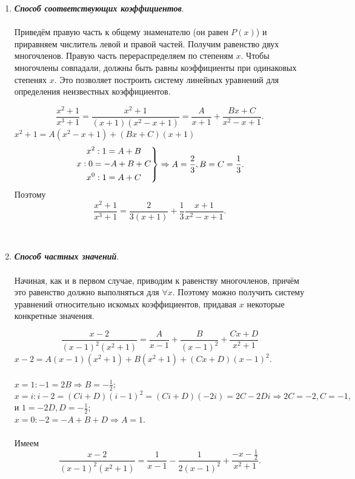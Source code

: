 \begin{enumerate}
	\item \textit{\textbf{Способ соответствующих коэффициентов}}.\\\\
	Приведём правую часть к общему знаменателю (он равен $P(x)$) и приравняем числитель левой и правой частей. Получим равенство двух многочленов. Правую часть перераспределяем по степеням $x$. Чтобы многочлены совпадали, должны быть равны коэффициенты при одинаковых степенях $x$. Это позволяет построить систему линейных уравнений для определения неизвестных коэффициентов.\\
	\begin{example} $$\frac{x^2+1}{x^3+1}=\frac{x^2+1}{(x+1)(x^2-x+1)}=\frac{A}{x+1}+\frac{Bx+C}{x^2-x+1}.$$
		$x^2+1=A(x^2-x+1)+(Bx+C)(x+1)$\\
		$$\left.\begin{gathered}
			x^2:1=A+B\\
			x:0=-A+B+C\\
			x^0:1=A+C
		\end{gathered}\right\}\Rightarrow A=\dfrac{2}{3},B=C=\dfrac{1}{3}.$$
		Поэтому $$\dfrac{x^2+1}{x^3+1}=\dfrac{2}{3(x+1)}+\dfrac{1}{3}\dfrac{x+1}{x^2-x+1}.$$
	\end{example}\\
	\item \textit{\textbf{Способ частных значений}}.\\\\
	Начиная, как и в первом случае, приводим к равенству многочленов, причём это равенство должно выполняться для $\forall x$. Поэтому можно получить систему уравнений относительно искомых коэффициентов, придавая $x$ некоторые конкретные значения.\\
	\begin{example} $$\frac{x-2}{(x-1)^2(x^2+1)}=\frac{A}{x-1}+\frac{B}{(x-1)^2}+\frac{Cx+D}{x^2+1}$$
		$x-2=A(x-1)(x^2+1)+B(x^2+1)+(Cx+D)(x-1)^2$.\\\\
		$x=1:-1=2B\Rightarrow B=-\frac{1}{2}$;\\
		$x=i:i-2=(Ci+D)(i-1)^2=(Ci+D)(-2i)=2C-2Di\Rightarrow 2C=-2, C=-1,$ и $1=-2D, D=-\frac{1}{2}$;\\
		$x=0:-2=-A+B+D\Rightarrow A=1$.\\\\
		Имеем $$\frac{x-2}{(x-1)^2(x^2+1)}=\frac{1}{x-1}-\frac{1}{2(x-1)^2}+\frac{-x-\frac{1}{2}}{x^2+1}.$$
	\end{example}\\\\

\end{enumerate}
